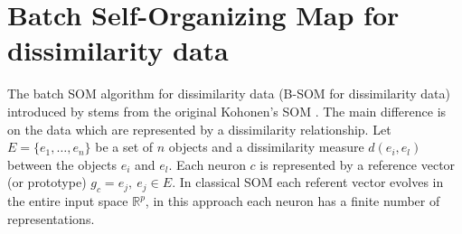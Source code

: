 \documentclass[10pt, conference, compsocconf]{IEEEtran}
\begin{document}





%
%
%


\section{Batch Self-Organizing Map for dissimilarity data}\label{sec:som_batch}

The batch SOM algorithm for dissimilarity data (B-SOM for dissimilarity data) introduced by \cite{golli:2004} stems from the original Kohonen's SOM \cite{Badran:2005}. The main difference is on the data which are represented by a dissimilarity relationship. Let $E = \{e_1,\dots,e_n\}$ be a set of $n$ objects and a dissimilarity measure $d(e_i, e_l)$ between the objects $e_i$ and $e_l$. Each neuron $c$ is represented by a reference vector (or prototype) $g_c = e_j, \: e_j \in E$. In classical SOM each referent vector evolves in the entire input space $\mathbb{R}^p$, in this approach each neuron has a finite number of representations.
\end{document}
